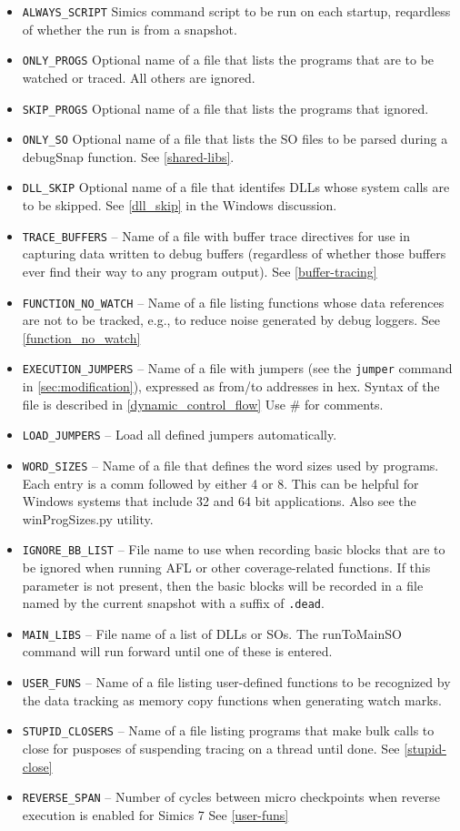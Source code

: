 \documentclass[titlepage]{article}
\begin{document}
\begin{itemize}
\item {\tt ALWAYS\_SCRIPT} Simics command script to be run on each startup, reqardless of whether the run is from a snapshot.
\item {\tt ONLY\_PROGS} Optional name of a file that lists the programs that are to be watched or traced.  All others are ignored.
\item {\tt SKIP\_PROGS} Optional name of a file that lists the programs that ignored.
\item {\tt ONLY\_SO} Optional name of a file that lists the SO files to be parsed during a debugSnap function. See \ref{shared-libs}.
\item {\tt DLL\_SKIP} Optional name of a file that identifes DLLs whose system calls are to be skipped.  See \ref{dll_skip} in the Windows discussion.
\item {\tt TRACE\_BUFFERS} -- Name of a file with buffer trace directives for use in capturing data written to debug buffers (regardless of whether those
buffers ever find their way to any program output). See \ref{buffer-tracing}
\item {\tt FUNCTION\_NO\_WATCH} -- Name of a file listing functions whose data references are not to be tracked, e.g., to reduce noise generated by debug loggers. See 
\ref{function_no_watch}
\item {\tt EXECUTION\_JUMPERS} -- Name of a file with jumpers (see the {\tt jumper} command in \ref{sec:modification}), expressed as 
from/to addresses in hex.  Syntax of the file is described in \ref{dynamic_control_flow}  Use \# for comments.  
\item {\tt LOAD\_JUMPERS} -- Load all defined jumpers automatically.
\item {\tt WORD\_SIZES} -- Name of a file that defines the word sizes used by programs.  Each entry is a comm followed by either 4 or 8.
This can be helpful for Windows systems that include 32 and 64 bit applications.  Also see the winProgSizes.py utility.
\item {\tt IGNORE\_BB\_LIST} -- File name to use when recording basic blocks that are to be ignored when running AFL or other coverage-related functions.  If this parameter
is not present, then the basic blocks will be recorded in a file named by the current snapshot with a suffix of {\tt .dead}.
\item {\tt MAIN\_LIBS} -- File name of a list of DLLs or SOs.  The runToMainSO command will run forward until one of these is entered.
\item {\tt USER\_FUNS} -- Name of a file listing user-defined functions to be recognized by the data tracking as memory copy functions when generating watch marks. 
\item {\tt STUPID\_CLOSERS} -- Name of a file listing programs that make bulk calls to close for pusposes of suspending tracing on a thread until done.  See \ref{stupid-close}
\item {\tt REVERSE\_SPAN} -- Number of cycles between micro checkpoints when reverse execution is enabled for Simics 7
See \ref{user-funs}
\end{itemize}
\end{document}
